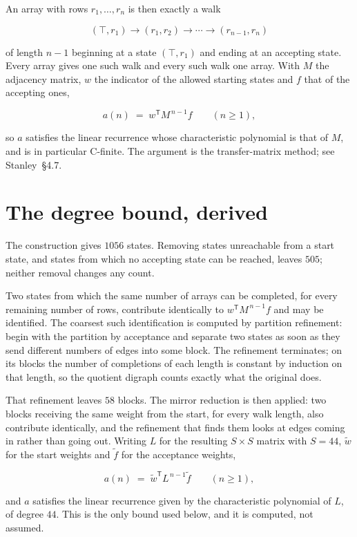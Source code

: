 \documentclass[11pt]{article}
\theoremstyle{definition}
\begin{document}
An array with rows $r_1,\dots,r_n$ is then exactly a walk

\[(\top,r_1) \to (r_1,r_2) \to \cdots \to (r_{n-1},r_n)\]

of length $n-1$ beginning at a state $(\top,r_1)$ and ending at an accepting state. Every array gives one such walk and every such walk one array. With $M$ the adjacency matrix, $w$ the indicator of the allowed starting states and $f$ that of the accepting ones,

\[a(n) \;=\; w^{\mathsf T} M^{\,n-1} f \qquad (n \ge 1),\]

so $a$ satisfies the linear recurrence whose characteristic polynomial is that of $M$, and is in particular C-finite. The argument is the transfer-matrix method; see Stanley~\S4.7.

\section{The degree bound, derived}

The construction gives $1056$ states. Removing states unreachable from a start state, and states from which no accepting state can be reached, leaves $505$; neither removal changes any count.

Two states from which the same number of arrays can be completed, for every remaining number of rows, contribute identically to $w^{\mathsf T}M^{\,n-1}f$ and may be identified. The coarsest such identification is computed by partition refinement: begin with the partition by acceptance and separate two states as soon as they send different numbers of edges into some block. The refinement terminates; on its blocks the number of completions of each length is constant by induction on that length, so the quotient digraph counts exactly what the original does.

That refinement leaves $58$ blocks. The mirror reduction is then applied: two blocks receiving the same weight from the start, for every walk length, also contribute identically, and the refinement that finds them looks at edges coming in rather than going out. Writing $L$ for the resulting $S \times S$ matrix with $S = 44$, $\tilde w$ for the start weights and $\tilde f$ for the acceptance weights,

\[a(n) \;=\; \tilde w^{\mathsf T} L^{\,n-1} \tilde f \qquad (n \ge 1),\]

and $a$ satisfies the linear recurrence given by the characteristic polynomial of $L$, of degree $44$. This is the only bound used below, and it is computed, not assumed.
\end{document}
